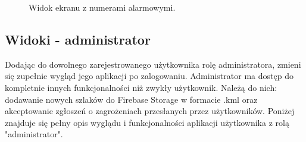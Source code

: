 \begin{figure}[H]
    \centering
    \caption{Widok ekranu z numerami alarmowymi.}
    \label{widok:telefony}
\end{figure}

\subsection{Widoki - administrator}
Dodając do dowolnego zarejestrowanego użytkownika rolę administratora, zmieni się zupełnie wygląd jego aplikacji po zalogowaniu. Administrator ma dostęp do kompletnie innych funkcjonalności niż zwykły użytkownik. Należą do nich: dodawanie nowych szlaków do Firebase Storage w formacie .kml oraz akceptowanie zgłoszeń o zagrożeniach przesłanych przez użytkowników. Poniżej znajduje się pełny opis wyglądu i funkcjonalności aplikacji użytkownika z rolą "administrator".
\\

